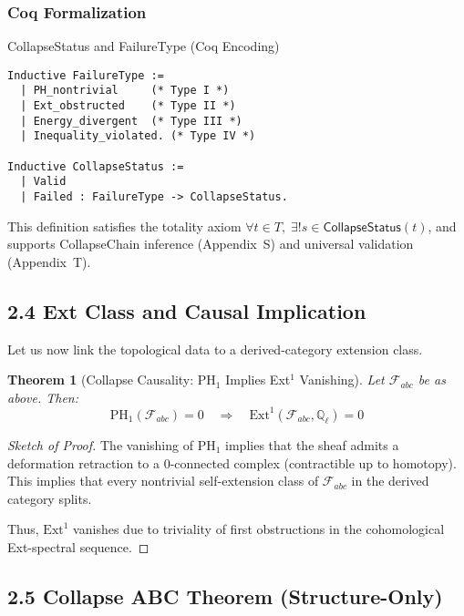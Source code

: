 \documentclass[11pt]{article}
\newtheorem{theorem}{Theorem}[section]
\begin{document}
\subsubsection*{Coq Formalization}

\begin{subsection}{CollapseStatus and FailureType (Coq Encoding)}
\begin{lstlisting}
Inductive FailureType :=
  | PH_nontrivial     (* Type I *)
  | Ext_obstructed    (* Type II *)
  | Energy_divergent  (* Type III *)
  | Inequality_violated. (* Type IV *)

Inductive CollapseStatus :=
  | Valid
  | Failed : FailureType -> CollapseStatus.
\end{lstlisting}
\end{subsection}

This definition satisfies the totality axiom \( \forall t \in T,\; \exists! s \in \mathsf{CollapseStatus}(t) \), and supports CollapseChain inference (Appendix~S) and universal validation (Appendix~T).

\subsection{2.4 Ext Class and Causal Implication}

Let us now link the topological data to a derived-category extension class.

\begin{theorem}[Collapse Causality: PH$_1$ Implies Ext$^1$ Vanishing]
Let $\mathcal{F}_{abc}$ be as above. Then:
\[
\mathrm{PH}_1(\mathcal{F}_{abc}) = 0 \quad \Rightarrow \quad \mathrm{Ext}^1(\mathcal{F}_{abc}, \mathbb{Q}_\ell) = 0
\]
\end{theorem}

\begin{proof}[Sketch of Proof]
The vanishing of $\mathrm{PH}_1$ implies that the sheaf admits a deformation retraction to a 0-connected complex (contractible up to homotopy). This implies that every nontrivial self-extension class of $\mathcal{F}_{abc}$ in the derived category splits.

Thus, $\mathrm{Ext}^1$ vanishes due to triviality of first obstructions in the cohomological Ext-spectral sequence.
\end{proof}

\subsection{2.5 Collapse ABC Theorem (Structure-Only)}
\end{document}
